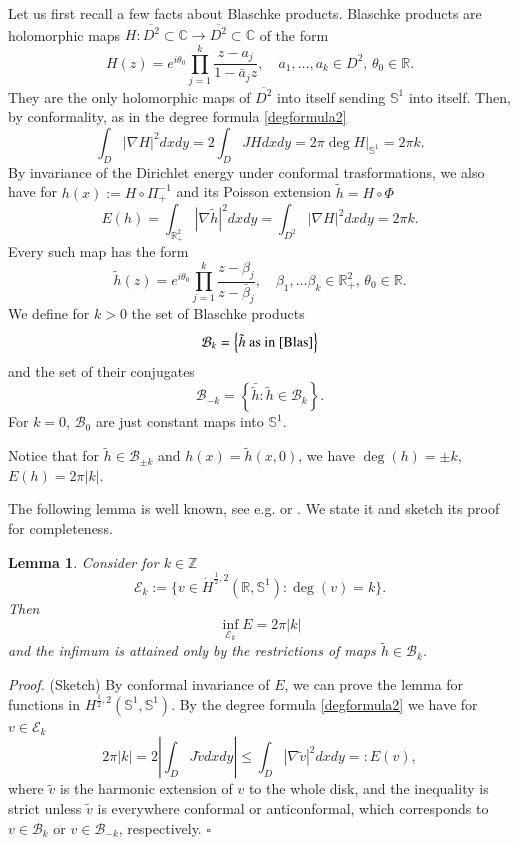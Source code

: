 \documentclass[12pt, a4paper]{article}
\newtheorem{lem}[thm]{Lemma}
\newenvironment{proof}{\noindent\emph{Proof.}}{\hfill$\square$\medskip}
\newcommand{\M}[1]{\mathcal{#1}}
\newcommand{\sph}{\mathbb{S}}
\newcommand{\R}{\mathbb{R}}
\newcommand{\cl}[1]{\overline{#1}}
\renewcommand{\(}{\left(}
\renewcommand{\)}{\right)}
\begin{document}
Let us first recall a few facts about Blaschke products.
Blaschke products are holomorphic maps $H:\cl{D^2}\subset \mathbb{C}\to \cl{D^2} \subset \mathbb{C}$ of the form
$$H(z)= e^{i\theta_0}\prod_{j=1}^k \frac{z-a_j}{1-\bar a_j z},\quad a_1,\dots, a_k\in D^2,\, \theta_0\in \R.$$
They are the only holomorphic maps of $\cl{D^2}$ into itself sending $\sph^1$ into itself.
Then, by conformality, as in the degree formula \eqref{degformula2}%
$$\int_D |\nabla H|^2 dx dy = 2 \int_{D} JH dxdy =2\pi \deg H|_{\sph^1}=2\pi k.$$
By invariance of the Dirichlet energy under conformal trasformations, we also have for    $h(x):=H\circ \Pi_+^{-1}$ and its Poisson extension $\tilde h =H\circ\Phi$
$$E(h)=\int_{\R^2_+}|\nabla \tilde h|^2 dxdy=\int_{D^2}|\nabla H|^2dxdy=2\pi k.$$
Every such map has the form
\begin{equation}\label{Blas}
\tilde h(z)= e^{i\theta_0}\prod_{j=1}^k\frac{z-\beta_j}{z-\bar \beta_j},\quad \beta_1,\dots\beta_k\in \R^2_+,\, \theta_0\in \R.
\end{equation}
We define for $k>0$ the set of Blaschke products
$$\M{B}_k=\left\{\tilde h\text{ as in }\eqref{Blas}\right\} $$
and the set of their conjugates
$$\M{B}_{-k}=\left\{\bar{\tilde h}: \tilde h \in \M{B}_k\right\}.$$
For $k=0$, $\M{B}_0$ are just constant maps into $\sph^1$.

\medskip

Notice that for $\tilde h\in \M{B}_{\pm k}$ and $h(x)=\tilde h(x,0)$, we have $\deg(h)=\pm k$, $E(h)=2\pi|k|$.

\medskip

The following lemma is well known, see e.g. \cite[Lemma 3.1]{BMRS} or \cite[Thm. 12.10]{BM}. We state it and sketch its proof for completeness.

\begin{lem}\label{l:Blas} Consider for $k\in\mathbb{Z}$
$$\M{E}_k:=\{v\in \dot H^{\frac12,2}(\R,\sph^1):\deg(v)=k\}.$$
Then
$$\inf_{\M{E}_k}E=2\pi|k|$$
and the infimum is attained only by the restrictions of  maps $\tilde h\in \M{B}_k$.  %
\end{lem}

\begin{proof} (Sketch) By conformal invariance of $E$, we can prove the lemma for functions in $H^{\frac12,2}(\sph^1,\sph^1)$. By the degree formula \eqref{degformula2} we have for $v\in \M{E}_k$
$$2\pi |k|=2\left|\int_D J\tilde v dxdy\right|\le \int_D|\nabla \tilde v|^2dxdy=: E(v), $$
where $\tilde v$ is the harmonic extension of $v$ to the whole disk, and the inequality is strict unless $\tilde v$ is everywhere conformal or anticonformal, which corresponds to $v\in \M{B}_k$ or $v\in \M{B}_{-k}$, respectively.
\end{proof}
\end{document}
